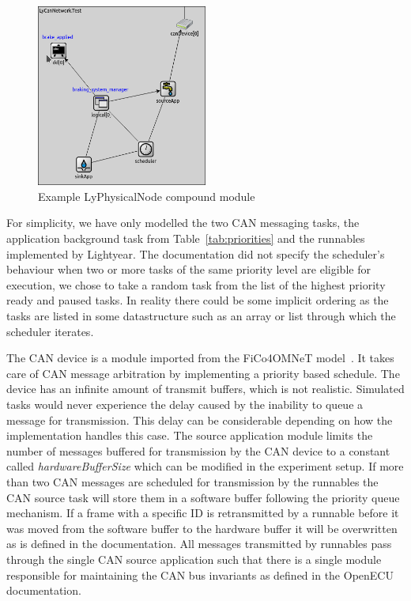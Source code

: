 \begin{figure}[htb]
    \centering
    \includegraphics[width=0.5\textwidth]{images/LyPhysicalNode_example.png}
    \caption{Example LyPhysicalNode compound module}
    \label{fig:lyphysicalnode}
\end{figure}

For simplicity, we have only modelled the two CAN messaging tasks, the application background task from Table~\ref{tab:priorities} and the runnables implemented by Lightyear. The documentation did not specify the scheduler's behaviour when two or more tasks of the same priority level are eligible for execution, we chose to take a random task from the list of the highest priority ready and paused tasks. In reality there could be some implicit ordering as the tasks are listed in some datastructure such as an array or list through which the scheduler iterates. 

The CAN device is a module imported from the FiCo4OMNeT model~\cite{meyer2019simulation}. It takes care of CAN message arbitration by implementing a priority based schedule. The device has an infinite amount of transmit buffers, which is not realistic. Simulated tasks would never experience the delay caused by the inability to queue a message for transmission. This delay can be considerable depending on how the implementation handles this case. The source application module limits the number of messages buffered for transmission by the CAN device to a constant called \textit{hardwareBufferSize} which can be modified in the experiment setup. If more than two CAN messages are scheduled for transmission by the runnables the CAN source task will store them in a software buffer following the priority queue mechanism. If a frame with a specific ID is retransmitted by a runnable before it was moved from the software buffer to the hardware buffer it will be overwritten as is defined in the documentation. All messages transmitted by runnables pass through the single CAN source application such that there is a single module responsible for maintaining the CAN bus invariants as defined in the OpenECU documentation. 

